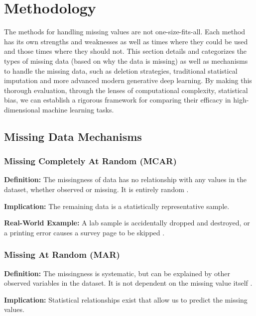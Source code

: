 \documentclass[journal]{IEEEtran}
\begin{document}
\section{Methodology}
The methods for handling missing values are not one-size-fits-all. Each method has its own strengths and weaknesses as well as times where they could be used and those times where they should not. This section details and categorizes the types of missing data (based on why the data is missing) as well as mechanisms to handle the missing data, such as deletion strategies, traditional statistical imputation and more advanced modern generative deep learning.
By making this thorough evaluation, through the lenses of computational complexity, statistical bias, we can establish a rigorous framework for comparing their efficacy in high-dimensional machine learning tasks.

\subsection{Missing Data Mechanisms}

\subsubsection{Missing Completely At Random (MCAR)}

\noindent \textbf{Definition:} The missingness of data has no relationship with any values in the dataset, whether observed or missing. It is entirely random \cite{kang2013prevention}.

\noindent \textbf{Implication:} The remaining data is a statistically representative sample.

\noindent \textbf{Real-World Example:} A lab sample is accidentally dropped and destroyed, or a printing error causes a survey page to be skipped \cite{zhou2024comprehensive}.

\subsubsection{Missing At Random (MAR)}

\noindent \textbf{Definition:} The missingness is systematic, but can be explained by other observed variables in the dataset. It is not dependent on the missing value itself \cite{kang2013prevention}.

\noindent \textbf{Implication:} Statistical relationships exist that allow us to predict the missing values.
\end{document}

